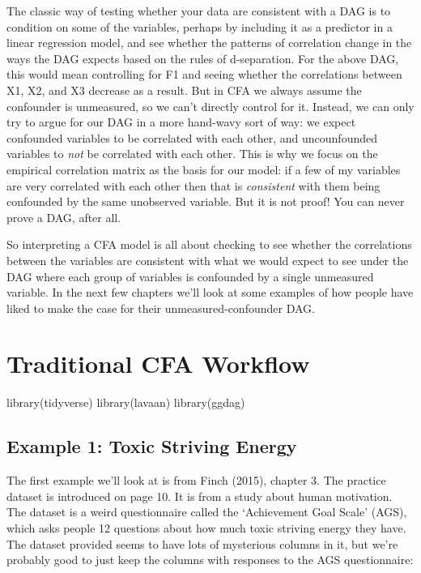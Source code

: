 \documentclass[
  letterpaper,
  DIV=11,
  numbers=noendperiod]{scrreprt}
\newenvironment{Shaded}{\begin{snugshade}}{\end{snugshade}}
\newcommand{\FunctionTok}[1]{\textcolor[rgb]{0.28,0.35,0.67}{#1}}
\newcommand{\NormalTok}[1]{\textcolor[rgb]{0.00,0.23,0.31}{#1}}
\begin{document}
The classic way of testing whether your data are consistent with a DAG
is to condition on some of the variables, perhaps by including it as a
predictor in a linear regression model, and see whether the patterns of
correlation change in the ways the DAG expects based on the rules of
d-separation. For the above DAG, this would mean controlling for F1 and
seeing whether the correlations between X1, X2, and X3 decrease as a
result. But in CFA we always assume the confounder is unmeasured, so we
can't directly control for it. Instead, we can only try to argue for our
DAG in a more hand-wavy sort of way: we expect confounded variables to
be correlated with each other, and uncounfounded variables to \emph{not}
be correlated with each other. This is why we focus on the empirical
correlation matrix as the basis for our model: if a few of my variables
are very correlated with each other then that is \emph{consistent} with
them being confounded by the same unobserved variable. But it is not
proof! You can never prove a DAG, after all.

So interpreting a CFA model is all about checking to see whether the
correlations between the variables are consistent with what we would
expect to see under the DAG where each group of variables is confounded
by a single unmeasured variable. In the next few chapters we'll look at
some examples of how people have liked to make the case for their
unmeasured-confounder DAG.

\hypertarget{sec-basic-workflow}{%
\chapter{Traditional CFA Workflow}\label{sec-basic-workflow}}

\begin{Shaded}
\begin{Highlighting}[]
\FunctionTok{library}\NormalTok{(tidyverse)}
\FunctionTok{library}\NormalTok{(lavaan)}
\FunctionTok{library}\NormalTok{(ggdag)}
\end{Highlighting}
\end{Shaded}

\hypertarget{example-1-toxic-striving-energy}{%
\section*{Example 1: Toxic Striving
Energy}\label{example-1-toxic-striving-energy}}

The first example we'll look at is from Finch (2015), chapter 3. The
practice dataset is introduced on page 10. It is from a study about
human motivation. The dataset is a weird questionnaire called the
`Achievement Goal Scale' (AGS), which asks people 12 questions about how
much toxic striving energy they have. The dataset provided seems to have
lots of mysterious columns in it, but we're probably good to just keep
the columns with responses to the AGS questionnaire:
\end{document}
